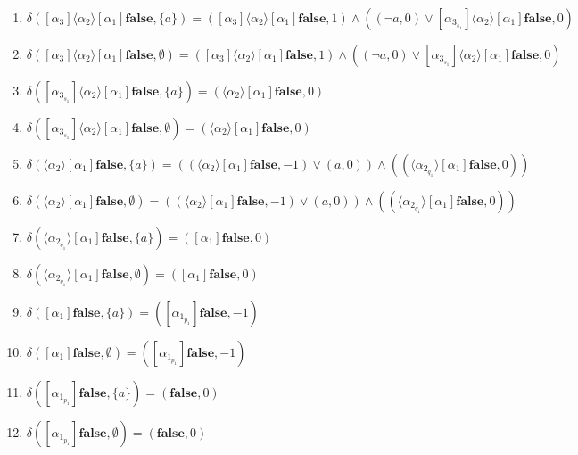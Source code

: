 \documentclass{lmcs}
\theoremstyle{definition}
\newcommand{\dbox}[1]{\langle #1 \rangle}
\newcommand{\bbox}[1]{[ #1 ]}
\DeclareMathOperator{\?}{?}
\begin{document}
\begin{enumerate}[align=left]
\item $\delta(\bbox{\alpha_3}\dbox{\alpha_2}\bbox{\alpha_1}\textbf{false}, \{a\}) =
  (\bbox{\alpha_3}\dbox{\alpha_2}\bbox{\alpha_1}\textbf{false}, 1)  \wedge ((\neg a, 0) \vee \bbox{\alpha_{3_{s_1}}}\dbox{\alpha_2}\bbox{\alpha_1}\textbf{false}, 0)$

 \item $\delta(\bbox{\alpha_3}\dbox{\alpha_2}\bbox{\alpha_1}\textbf{false}, \emptyset) =
  (\bbox{\alpha_3}\dbox{\alpha_2}\bbox{\alpha_1}\textbf{false}, 1)  \wedge ((\neg a, 0) \vee \bbox{\alpha_{3_{s_1}}}\dbox{\alpha_2}\bbox{\alpha_1}\textbf{false}, 0)$

 \item $\delta(\bbox{\alpha_{3_{s_1}}}\dbox{\alpha_2}\bbox{\alpha_1}\textbf{false}, \{a\}) =
   (\dbox{\alpha_2}\bbox{\alpha_1}\textbf{false},0)$

 \item $\delta(\bbox{\alpha_{3_{s_1}}}\dbox{\alpha_2}\bbox{\alpha_1}\textbf{false}, \emptyset) =
   (\dbox{\alpha_2}\bbox{\alpha_1}\textbf{false},0)$

 \item $\delta(\dbox{\alpha_2}\bbox{\alpha_1}\textbf{false}, \{a\}) =
   ((\dbox{\alpha_2}\bbox{\alpha_1}\textbf{false}, -1) \vee (a, 0)) \wedge ((\dbox{\alpha_{2_{q_1}}}\bbox{\alpha_1}\textbf{false},0))$

 \item $\delta(\dbox{\alpha_2}\bbox{\alpha_1}\textbf{false}, \emptyset) =
   ((\dbox{\alpha_2}\bbox{\alpha_1}\textbf{false}, -1) \vee (a, 0)) \wedge ((\dbox{\alpha_{2_{q_1}}}\bbox{\alpha_1}\textbf{false},0))$

 \item $\delta(\dbox{\alpha_{2_{q_1}}}\bbox{\alpha_1}\textbf{false}, \{a\}) =
   (\bbox{\alpha_1}\textbf{false},0)$

 \item $\delta(\dbox{\alpha_{2_{q_1}}}\bbox{\alpha_1}\textbf{false}, \emptyset) =
   (\bbox{\alpha_1}\textbf{false},0)$

 \item $\delta(\bbox{\alpha_1}\textbf{false}, \{a\}) =
   (\bbox{\alpha_{1_{p_1}}}\textbf{false}, -1)$

 \item $\delta(\bbox{\alpha_1}\textbf{false}, \emptyset) =
   (\bbox{\alpha_{1_{p_1}}}\textbf{false}, -1)$

 \item $\delta(\bbox{\alpha_{1_{p_1}}}\textbf{false}, \{a\}) =
   (\textbf{false},0) $

 \item $\delta(\bbox{\alpha_{1_{p_1}}}\textbf{false}, \emptyset) =
   (\textbf{false},0) $

\end{enumerate}
\end{document}
